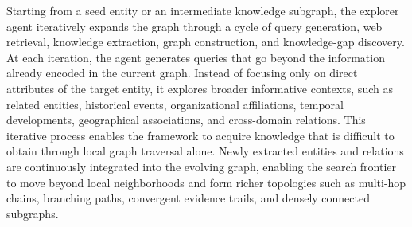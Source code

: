 \documentclass{huawei}
\begin{document}
Starting from a seed entity or an intermediate knowledge subgraph, the explorer agent iteratively expands the graph through a cycle of query generation, web retrieval, knowledge extraction, graph construction, and knowledge-gap discovery. At each iteration, the agent generates queries that go beyond the information already encoded in the current graph. Instead of focusing only on direct attributes of the target entity, it explores broader informative contexts, such as related entities, historical events, organizational affiliations, temporal developments, geographical associations, and cross-domain relations. This iterative process enables the framework to acquire knowledge that is difficult to obtain through local graph traversal alone. Newly extracted entities and relations are continuously integrated into the evolving graph, enabling the search frontier to move beyond local neighborhoods and form richer topologies such as multi-hop chains, branching paths, convergent evidence trails, and densely connected subgraphs.%


\end{document}
